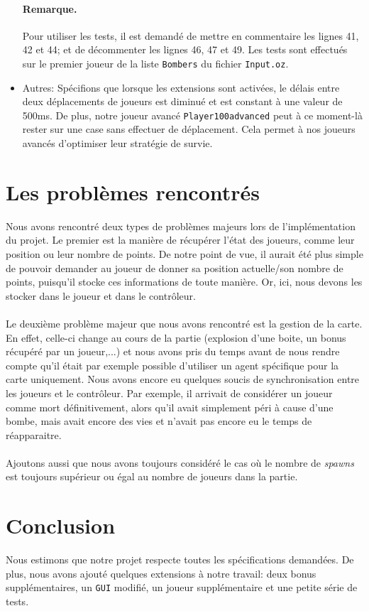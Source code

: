 \documentclass{article}
\begin{document}
\begin{itemize}
	\paragraph{Remarque.}Pour utiliser les tests, il est demandé de mettre en commentaire les lignes 41, 42 et 44; et de décommenter les lignes 46, 47 et 49. Les tests sont effectués sur le premier joueur de la liste \texttt{Bombers} du fichier \texttt{Input.oz}.
	\item Autres: Spécifions que lorsque les extensions sont activées, le délais entre deux déplacements de joueurs est diminué et est constant à une valeur de 500ms. De plus, notre joueur avancé \texttt{Player100advanced} peut à ce moment-là rester sur une case sans effectuer de déplacement. Cela permet à nos joueurs avancés d'optimiser leur stratégie de survie.
\end{itemize}
\section{Les problèmes rencontrés}
Nous avons rencontré deux types de problèmes majeurs lors de l'implémentation du projet. Le premier est la manière de récupérer l'état des joueurs, comme leur position ou leur nombre de points. De notre point de vue, il aurait été plus simple de pouvoir demander au joueur de donner sa position actuelle/son nombre de points, puisqu'il stocke ces informations de toute manière. Or, ici, nous devons les stocker dans le joueur et dans le contrôleur.\\ \\
Le deuxième problème majeur que nous avons rencontré est la gestion de la carte. En effet, celle-ci change au cours de la partie (explosion d'une boite, un bonus récupéré par un joueur,...) et nous avons pris du temps avant de nous rendre compte qu'il était par exemple possible d'utiliser un agent spécifique pour la carte uniquement. Nous avons encore eu quelques soucis de synchronisation entre les joueurs et le contrôleur. Par exemple, il arrivait de considérer un joueur comme mort définitivement, alors qu'il avait simplement péri à cause d'une bombe, mais avait encore des vies et n'avait pas encore eu le temps de réapparaitre.\\ \\
Ajoutons aussi que nous avons toujours considéré le cas où le nombre de \emph{spawns} est toujours supérieur ou égal au nombre de joueurs dans la partie.

\section{Conclusion}
Nous estimons que notre projet respecte toutes les spécifications demandées. De plus, nous avons ajouté quelques extensions à notre travail: deux bonus supplémentaires, un \texttt{GUI} modifié, un joueur supplémentaire et une petite série de tests. 
\end{document}

